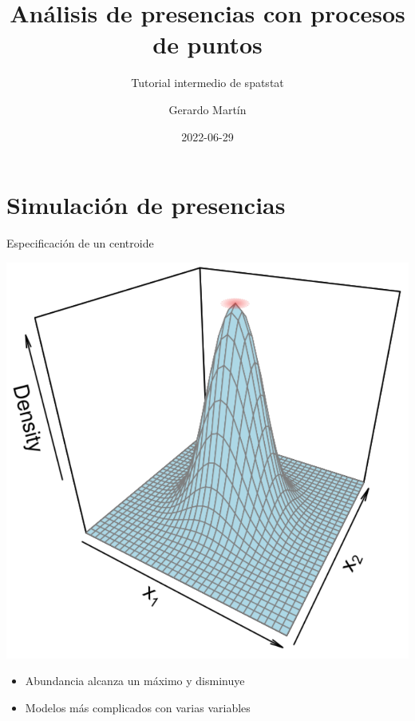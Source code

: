 \documentclass[
  11pt,
  ignorenonframetext,
]{beamer}
\title{Análisis de presencias con procesos de puntos}
\subtitle{Tutorial intermedio de spatstat}
\author{Gerardo Martín}
\date{2022-06-29}
\providecommand{\tightlist}{%
  \setlength{\itemsep}{0pt}\setlength{\parskip}{0pt}}
\begin{document}
\frame{\titlepage}

\hypertarget{simulaciuxf3n-de-presencias}{%
\section{Simulación de presencias}\label{simulaciuxf3n-de-presencias}}

\begin{frame}{Especificación de un centroide}
\protect\hypertarget{especificaciuxf3n-de-un-centroide}{}
\begin{center}\includegraphics{Figuras/Centroide} \end{center}

\begin{itemize}
\tightlist
\item
  Abundancia alcanza un máximo y disminuye
\item
  Modelos más complicados con varias variables
\end{itemize}
\end{frame}
\end{document}
